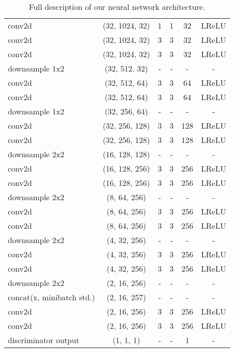 \begin{table}[h!]
{\begin{tabular}{l c c c c c}
  conv2d & (32, 1024, 32) & 1 & 1 & 32 & LReLU \\
  conv2d & (32, 1024, 32) & 3 & 3 & 32 & LReLU \\
  conv2d & (32, 1024, 32) & 3 & 3 & 32 & LReLU \\
  downsample 1x2 & (32, 512, 32) & - & - & - & - \\
  conv2d & (32, 512, 64) & 3 & 3 & 64 & LReLU \\
  conv2d & (32, 512, 64) & 3 & 3 & 64 & LReLU \\
  downsample 1x2 & (32, 256, 64) & - & - & - & - \\
  conv2d & (32, 256, 128) & 3 & 3 & 128 & LReLU \\
  conv2d & (32, 256, 128) & 3 & 3 & 128 & LReLU \\
  downsample 2x2 & (16, 128, 128) & - & - & - & - \\
  conv2d & (16, 128, 256) & 3 & 3 & 256 & LReLU \\
  conv2d & (16, 128, 256) & 3 & 3 & 256 & LReLU \\
  downsample 2x2 & (8, 64, 256) & - & - & - & - \\
  conv2d & (8, 64, 256) & 3 & 3 & 256 & LReLU \\
  conv2d & (8, 64, 256) & 3 & 3 & 256 & LReLU \\
  downsample 2x2 & (4, 32, 256) & - & - & - & - \\
  conv2d & (4, 32, 256) & 3 & 3 & 256 & LReLU \\
  conv2d & (4, 32, 256) & 3 & 3 & 256 & LReLU \\
  downsample 2x2 & (2, 16, 256) & - & - & - & - \\
  concat(x, minibatch std.) & (2, 16, 257) & - & - & - & - \\
  conv2d & (2, 16, 256) & 3 & 3 & 256 & LReLU \\
  conv2d & (2, 16, 256) & 3 & 3 & 256 & LReLU \\ \hline
  discriminator output & (1, 1, 1) & - & - & 1 & - \\ 
  \bottomrule
\end{tabular}}
\caption{Full description of our neural network architecture.}
\label{table:arch}
\end{table}